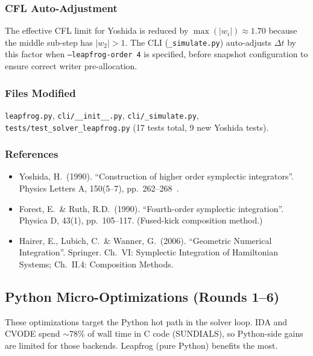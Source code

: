 \subsubsection{CFL Auto-Adjustment}
\label{sec:cfl-adjustment}

The effective CFL limit for Yoshida is reduced by $\max(|w_i|) \approx 1.70$ because
the middle sub-step has $|w_2| > 1$. The CLI (\texttt{\_simulate.py}) auto-adjusts $\Delta t$
by this factor when \texttt{--leapfrog-order 4} is specified, before snapshot
configuration to ensure correct writer pre-allocation.

\subsubsection{Files Modified}
\label{sec:yoshida-files}

\texttt{leapfrog.py}, \texttt{cli/\_\_init\_\_.py}, \texttt{cli/\_simulate.py},
\texttt{tests/test\_solver\_leapfrog.py} (17 tests total, 9 new Yoshida tests).

\subsubsection{References}
\label{sec:yoshida-references}

\begin{itemize}
  \item Yoshida, H.\ (1990). ``Construction of higher order symplectic integrators''.
    Physics Letters A, 150(5--7), pp.\ 262--268~\cite{yoshida1990symplectic}.
  \item Forest, E.\ \& Ruth, R.D.\ (1990). ``Fourth-order symplectic integration''.
    Physica D, 43(1), pp.\ 105--117. (Fused-kick composition method.)
  \item Hairer, E., Lubich, C.\ \& Wanner, G.\ (2006). ``Geometric Numerical Integration''.
    Springer. Ch.\ VI: Symplectic Integration of Hamiltonian Systems;
    Ch.\ II.4: Composition Methods.
\end{itemize}

\subsection{Python Micro-Optimizations (Rounds 1--6)}
\label{sec:micro-optimizations}

These optimizations target the Python hot path in the solver loop. IDA and
CVODE spend $\sim$78\% of wall time in C code (SUNDIALS), so Python-side gains
are limited for those backends. Leapfrog (pure Python) benefits the most.

